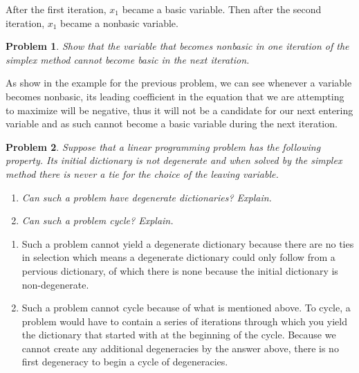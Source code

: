 \documentclass[12pt,oneside]{amsart}
\numberwithin{equation}{section}
\numberwithin{figure}{section}
\theoremstyle{plain}
\newtheorem{prob}{Problem}
\theoremstyle{definition}
\begin{document}
After the first iteration, $x_1$ became a basic variable. Then after the 
second iteration, $x_1$ became a nonbasic variable.
\begin{prob}
Show that the variable that becomes nonbasic in one iteration of the simplex 
method cannot become basic in the next iteration.
\end{prob}
As show in the example for the previous problem, we can see whenever a variable 
becomes nonbasic, its leading coefficient in the equation that we are attempting 
to maximize will be negative, thus it will not be a candidate for our next 
entering variable and as such cannot become a basic variable during the next 
iteration. \pagebreak
\begin{prob}
Suppose that a linear programming problem has the following property. Its initial 
dictionary is not degenerate and when solved by the simplex method there is 
never a tie for the choice of the leaving variable.
\begin{enumerate}
  \item Can such a problem have degenerate dictionaries? Explain.
  \item Can such a problem cycle? Explain.
\end{enumerate}
\end{prob}
\begin{enumerate}
  \item Such a problem cannot yield a degenerate dictionary because there are no 
    ties in selection which means a degenerate dictionary could only follow from 
    a pervious dictionary, of which there is none because the initial dictionary 
    is non-degenerate.
  \item Such a problem cannot cycle because of what is mentioned above. To cycle, 
    a problem would have to contain a series of iterations through which you 
    yield the dictionary that started with at the beginning of the cycle. Because
    we cannot create any additional degeneracies by the answer above, there is no 
    first degeneracy to begin a cycle of degeneracies.
\end{enumerate}
\end{document}
